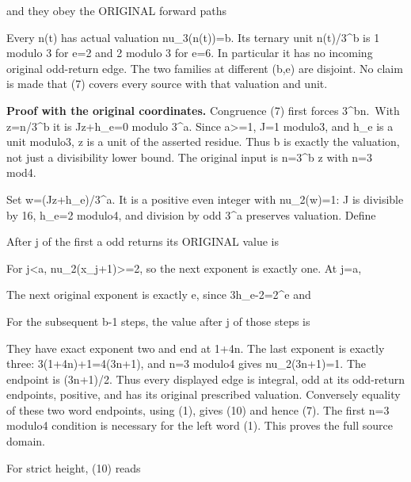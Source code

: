 and they obey the ORIGINAL forward paths


Every n(t) has actual valuation nu\_3(n(t))=b. Its ternary unit
n(t)/3\^{}b is 1 modulo 3 for e=2 and 2 modulo 3 for e=6. In particular
it has no incoming original odd-return edge. The two families at
different (b,e) are disjoint. No claim is made that (7) covers every
source with that valuation and unit.

\textbf{Proof with the original coordinates.} Congruence (7) first
forces 3\^{}b\textbar n.~With z=n/3\^{}b it is Jz+h\_e=0 modulo 3\^{}a.
Since a\textgreater=1, J=1 modulo3, and h\_e is a unit modulo3, z is a
unit of the asserted residue. Thus b is exactly the valuation, not just
a divisibility lower bound. The original input is n=3\^{}b z with n=3
mod4.

Set w=(Jz+h\_e)/3\^{}a. It is a positive even integer with nu\_2(w)=1: J
is divisible by 16, h\_e=2 modulo4, and division by odd 3\^{}a preserves
valuation. Define


After j of the first a odd returns its ORIGINAL value is


For j\textless a, nu\_2(x\_j+1)\textgreater=2, so the next exponent is
exactly one. At j=a,


The next original exponent is exactly e, since 3h\_e-2=2\^{}e and


For the subsequent b-1 steps, the value after j of those steps is


They have exact exponent two and end at 1+4n. The last exponent is
exactly three: 3(1+4n)+1=4(3n+1), and n=3 modulo4 gives nu\_2(3n+1)=1.
The endpoint is (3n+1)/2. Thus every displayed edge is integral, odd at
its odd-return endpoints, positive, and has its original prescribed
valuation. Conversely equality of these two word endpoints, using (1),
gives (10) and hence (7). The first n=3 modulo4 condition is necessary
for the left word (1). This proves the full source domain.

For strict height, (10) reads

